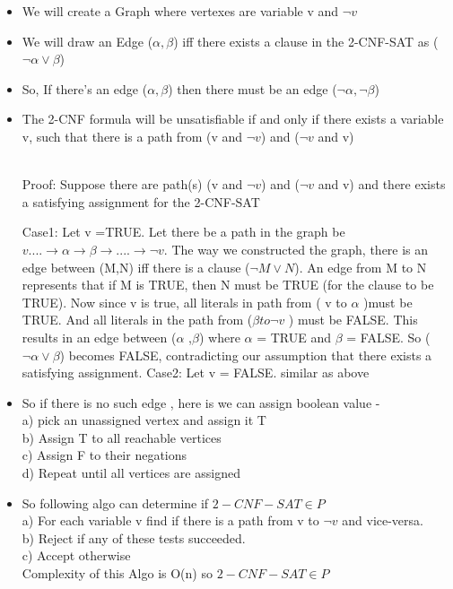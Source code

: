 \documentclass[5pt]{article}
\begin{document}
\begin{itemize}
\item We will create a Graph where vertexes are variable v and $\neg {v}$
\item  We will draw an Edge ($\alpha,\beta$) iff there exists a clause in the 2-CNF-SAT as ($\neg\alpha\lor\beta$)
\item So, If there's an edge ($\alpha,\beta$) then there must be an edge ($\neg\alpha,\neg\beta$)
\item The 2-CNF formula  will be unsatisfiable if and only if there exists a variable v, such that there is a path from  (v and $\neg {v}$) and ($\neg {v}$ and v)

~~\\Proof:  Suppose there are path(s) (v and $\neg {v}$) and ($\neg {v}$ and v) and there exists a satisfying assignment for the 2-CNF-SAT

Case1: Let v =TRUE.
Let there be a path in the graph  be  $v  ....  \rightarrow \alpha  \rightarrow \beta \rightarrow .... \rightarrow \neg {v} $. The way we constructed the graph, there is an edge between (M,N)  iff there is a clause ($\neg M \lor N$). 
An edge from M to N represents that if M is TRUE, then N must be TRUE (for the clause to be TRUE). Now since v is true, all literals in path from ( v to $\alpha$ )must be TRUE. And all literals in the path from ($ \beta
to \neg {v}$ ) must be FALSE. This results in an edge between ($\alpha$ ,$\beta$) where $\alpha$ = TRUE and $\beta$ = FALSE. So   ($\neg\alpha \lor \beta$) becomes FALSE, contradicting our assumption
that there exists a satisfying assignment.
Case2: Let v = FALSE. similar as above

\item So if there is no such edge , here is we can assign boolean value -
\\a) pick an unassigned vertex and assign it T
\\b) Assign T to all reachable vertices
\\c) Assign F to their negations
\\d) Repeat until all vertices are assigned

\item So following algo can determine if $2-CNF-SAT \in P$
\\a) For each variable v find if there is a path from v to $\neg v$ and vice-versa.
\\b)  Reject if any of these tests succeeded.
\\c)  Accept otherwise
\\ Complexity of this Algo is O(n) so $2-CNF-SAT \in P$
\end{itemize}
\end{document}
